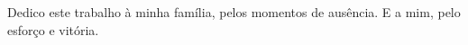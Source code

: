 
\begin{dedicatoria}%

Dedico este trabalho à minha família, pelos momentos de ausência. E a mim, pelo esforço e vitória.

\end{dedicatoria}
